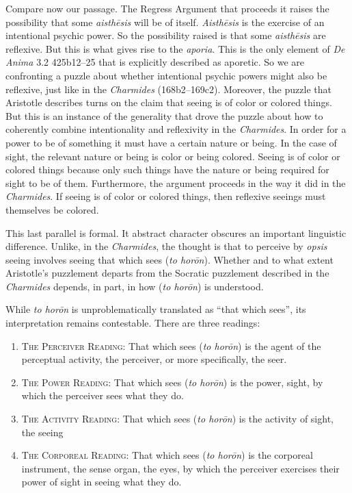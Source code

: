 Compare now our passage. The Regress Argument that proceeds it raises the possibility that some \emph{aisthēsis} will be of itself. \emph{Aisthēsis} is the exercise of an intentional psychic power. So the possibility raised is that some \emph{aisthēsis} are reflexive. But this is what gives rise to the \emph{aporia}. This is the only element of \emph{De Anima} 3.2 425b12–25 that is explicitly described as aporetic. So we are confronting a puzzle about whether intentional psychic powers might also be reflexive, just like in the \emph{Charmides} (168b2–169c2). Moreover, the puzzle that Aristotle describes turns on the claim that seeing is of color or colored things. But this is an instance of the generality that drove the puzzle about how to coherently combine intentionality and reflexivity in the \emph{Charmides}. In order for a power to be of something it must have a certain nature or being. In the case of sight, the relevant nature or being is color or being colored. Seeing is of color or colored things because only such things have the nature or being required for sight to be of them. Furthermore, the argument proceeds in the way it did in the \emph{Charmides}. If seeing is of color or colored things, then reflexive seeings must themselves be colored.

This last parallel is formal. It abstract character obscures an important linguistic difference. Unlike, in the \emph{Charmides}, the thought is that to perceive by \emph{opsis} seeing involves seeing that which sees (\emph{to horōn}). Whether and to what extent Aristotle's puzzlement departs from the Socratic puzzlement described in the \emph{Charmides} depends, in part, in how (\emph{to horōn}) is understood.

While \emph{to horōn} is unproblematically translated as ``that which sees'', its interpretation remains contestable. There are three readings:
\begin{enumerate}[(1)]
	\item \textsc{The Perceiver Reading}: That which sees (\emph{to horōn}) is the agent of the perceptual activity, the perceiver, or more specifically, the seer.
	\item \textsc{The Power Reading}: That which sees (\emph{to horōn}) is the power, sight, by which the perceiver sees what they do.
	\item \textsc{The Activity Reading}: That which sees (\emph{to horōn}) is the activity of sight, the seeing
	\item \textsc{The Corporeal Reading}: That which sees (\emph{to horōn}) is the corporeal instrument, the sense organ, the eyes, by which the perceiver exercises their power of sight in seeing what they do.
\end{enumerate}

